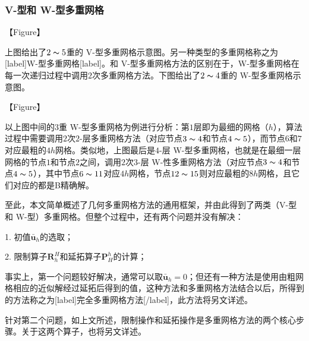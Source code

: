 \documentclass[12pt, UTF8, nofonts]{ctexart}
\begin{document}
\subsubsection*{V-型和 W-型多重网格}

【Figure】

上图给出了$2\thicksim5$重的 V-型多重网格示意图。另一种类型的多重网格称之为 [label]W-型多重网格[label]。和 V-型多重网格方法的区别在于，W-型多重网格在每一次递归过程中调用$2$次多重网格方法。下图给出了$2\thicksim4$重的 W-型多重网格示意图。

【Figure】

以上图中间的$3$重 W-型多重网格为例进行分析：第$1$层即为最细的网格（$h$），算法过程中需要调用$2$次$2$-层多重网格方法（对应节点$3\thicksim4$和节点$4\thicksim5$），而节点$6$和$7$对应最粗的$4h$网格。类似地，上图最后是$4$-层 W-型多重网格，也就是在最细一层网格的节点$1$和节点$2$之间，调用$2$次$3$-层 W-性多重网格方法（对应节点$3\thicksim4$和节点$4\thicksim5$），其中节点$6\thicksim11$对应$4h$网格，节点$12\thicksim15$则对应最粗的$8h$网格，且它们对应的都是B精确解。

至此，本文简单概述了几何多重网格方法的通用框架，并由此得到了两类（V-型和 W-型）多重网格。但整个过程中，还有两个问题并没有解决：

1. 初值$\bar{\boldsymbol{u}}_h$的选取；

2. 限制算子$\boldsymbol{R}_{h}^{H}$和延拓算子$\boldsymbol{P}_{H}^{h}$的计算；

事实上，第一个问题较好解决，通常可以取$\bar{\boldsymbol{u}}_h=0$；但还有一种方法是使用由粗网格相应的近似解经过延拓后得到的值，这种方法和多重网格方法结合以后，所得到的方法称之为[label]完全多重网格方法[/label]，此方法将另文详述。

针对第二个问题，如上文所述，限制操作和延拓操作是多重网格方法的两个核心步骤。关于这两个算子，也将另文详述。

\end{document}
